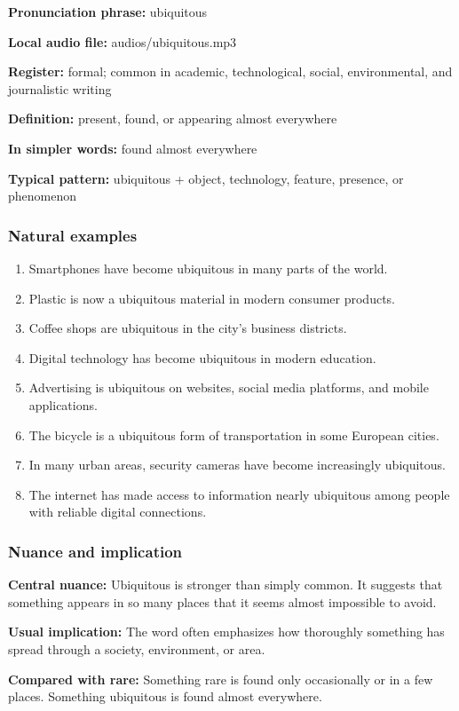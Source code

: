 \documentclass[11pt]{article}
\begin{document}
\textbf{Pronunciation phrase:} ubiquitous

\textbf{Local audio file:} audios/ubiquitous.mp3

\textbf{Register:} formal; common in academic, technological, social, environmental, and journalistic writing

\textbf{Definition:} present, found, or appearing almost everywhere

\textbf{In simpler words:} found almost everywhere

\textbf{Typical pattern:} ubiquitous + object, technology, feature, presence, or phenomenon

\subsubsection{Natural examples}
\begin{enumerate}
  \item Smartphones have become ubiquitous in many parts of the world.
  \item Plastic is now a ubiquitous material in modern consumer products.
  \item Coffee shops are ubiquitous in the city's business districts.
  \item Digital technology has become ubiquitous in modern education.
  \item Advertising is ubiquitous on websites, social media platforms, and mobile applications.
  \item The bicycle is a ubiquitous form of transportation in some European cities.
  \item In many urban areas, security cameras have become increasingly ubiquitous.
  \item The internet has made access to information nearly ubiquitous among people with reliable digital connections.
\end{enumerate}

\subsubsection{Nuance and implication}
\textbf{Central nuance:} Ubiquitous is stronger than simply common. It suggests that something appears in so many places that it seems almost impossible to avoid.

\textbf{Usual implication:} The word often emphasizes how thoroughly something has spread through a society, environment, or area.

\textbf{Compared with rare:} Something rare is found only occasionally or in a few places. Something ubiquitous is found almost everywhere.
\end{document}

